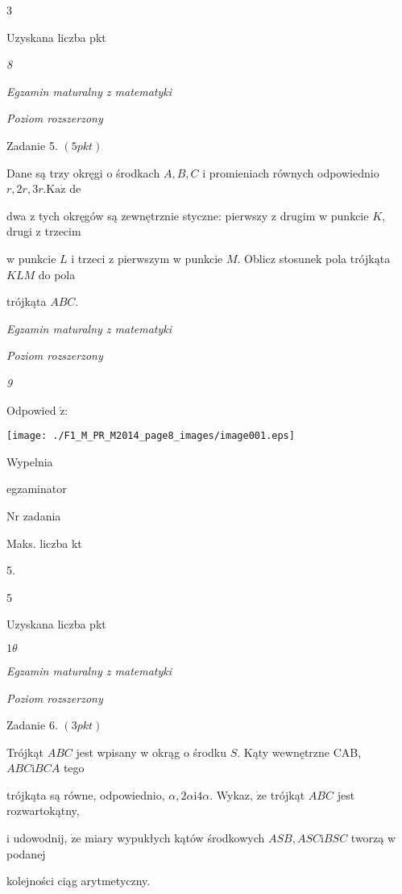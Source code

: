 \documentclass[a4paper,12pt]{article}
\begin{document}
3

Uzyskana liczba pkt





{\it 8}

{\it Egzamin maturalny z matematyki}

{\it Poziom rozszerzony}

Zadanie 5. $(5pkt)$

Dane są trzy okręgi o środkach $A, B, C$ i promieniach równych odpowiednio $r, 2r, 3r. \mathrm{K}\mathrm{a}\dot{\mathrm{z}}$ de

dwa z tych okręgów są zewnętrznie styczne: pierwszy z drugim w punkcie $K$, drugi z trzecim

w punkcie $L$ i trzeci z pierwszym w punkcie $M$. Oblicz stosunek pola trójkąta $KLM$ do pola

trójkąta $ABC.$





{\it Egzamin maturalny z matematyki}

{\it Poziom rozszerzony}

{\it 9}

Odpowied $\acute{\mathrm{z}}$:
\begin{center}
\texttt{[image: ./F1\_M\_PR\_M2014\_page8\_images/image001.eps]}
\end{center}
Wypelnia

egzaminator

Nr zadania

Maks. liczba kt

5.

5

Uzyskana liczba pkt





$ 1\theta$

{\it Egzamin maturalny z matematyki}

{\it Poziom rozszerzony}

Zadanie 6. $(3pkt)$

Trójkąt $ABC$ jest wpisany w okrąg o środku $S$. Kąty wewnętrzne CAB, $ABC\mathrm{i}BCA$ tego

trójkąta są równe, odpowiednio, $\alpha,  2\alpha \mathrm{i}  4\alpha$. Wykaz, $\dot{\mathrm{z}}\mathrm{e}$ trójkąt $ABC$ jest rozwartokątny,

i udowodnij, $\dot{\mathrm{z}}\mathrm{e}$ miary wypukłych kątów środkowych $ASB, ASC\mathrm{i}BSC$ tworzą w podanej

kolejności ciąg arytmetyczny.
\end{document}
